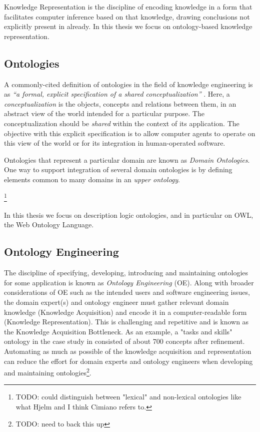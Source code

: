 \documentclass[a4paper]{report}
\newcommand{\todo}[1]{\footnote{{\color{red} TODO: #1}}}
\begin{document}
Knowledge Representation is the discipline of encoding knowledge in a form that facilitates computer inference based on that knowledge, drawing conclusions not explicitly present in already.
In this thesis we focus on ontology-based knowledge representation.

\subsection{Ontologies}
\label{sec:lit-rev:ontologies}

A commonly-cited definition of ontologies in the field of knowledge engineering is as \emph{``a formal, explicit specification of a shared conceptualization''} \cite{StuderEtAl1998KEPM}.
Here, a \emph{conceptualization} is the objects, concepts and relations between them, in an abstract view of the world intended for a particular purpose.
The conceptualization should be \emph{shared} within the context of its application.
The objective with this explicit specification is to allow computer agents to operate on this view of the world or for its integration in human-operated software.

Ontologies that represent a particular domain are known as \emph{Domain Ontologies}.
One way to support integration of several domain ontologies is by defining elements common to many domains in an \emph{upper ontology}\cite{SemanticIntegration2004Noy}.

\todo{could distinguish between "lexical" and non-lexical ontologies like what Hjelm and I think Cimiano refers to.}

In this thesis we focus on description logic ontologies, and in particular on OWL, the Web Ontology Language.

\subsection{Ontology Engineering}

The discipline of specifying, developing, introducing and maintaining ontologies for some application is known as \emph{Ontology Engineering} (OE)\cite{HOO2009OntEngMeth}.
Along with broader considerations of OE such as the intended users and software engineering issues, the domain expert(s) and ontology engineer must gather relevant domain knowledge (Knowledge Acquisition) and encode it in a computer-readable form (Knowledge Representation)\cite{OntMethOverv1999}.
This is challenging and repetitive and is known as the Knowledge Acquisition Bottleneck\cite{OLforSemWeb2001}.
As an example, a "tasks and skills" ontology in the case study in \cite{HOO2009OntEngMeth} consisted of about 700 concepts after refinement.
Automating as much as possible of the knowledge acquisition and representation can reduce the effort for domain experts and ontology engineers when developing and maintaining ontologies\todo{need to back this up}.
\end{document}
